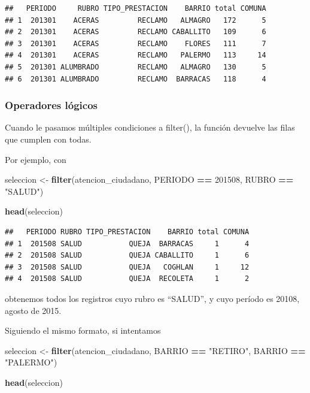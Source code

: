 \documentclass[spanish,]{book}
\newenvironment{Shaded}{\begin{snugshade}}{\end{snugshade}}
\newcommand{\DecValTok}[1]{\textcolor[rgb]{0.00,0.00,0.81}{#1}}
\newcommand{\KeywordTok}[1]{\textcolor[rgb]{0.13,0.29,0.53}{\textbf{#1}}}
\newcommand{\NormalTok}[1]{#1}
\newcommand{\OperatorTok}[1]{\textcolor[rgb]{0.81,0.36,0.00}{\textbf{#1}}}
\newcommand{\StringTok}[1]{\textcolor[rgb]{0.31,0.60,0.02}{#1}}
\begin{document}
\begin{verbatim}
##   PERIODO     RUBRO TIPO_PRESTACION    BARRIO total COMUNA
## 1  201301    ACERAS         RECLAMO   ALMAGRO   172      5
## 2  201301    ACERAS         RECLAMO CABALLITO   109      6
## 3  201301    ACERAS         RECLAMO    FLORES   111      7
## 4  201301    ACERAS         RECLAMO   PALERMO   113     14
## 5  201301 ALUMBRADO         RECLAMO   ALMAGRO   130      5
## 6  201301 ALUMBRADO         RECLAMO  BARRACAS   118      4
\end{verbatim}

\hypertarget{operadores-logicos}{%
\subsubsection{Operadores lógicos}\label{operadores-logicos}}

Cuando le pasamos múltiples condiciones a filter(), la función devuelve las filas que cumplen con todas.

Por ejemplo, con

\begin{Shaded}
\begin{Highlighting}[]
\NormalTok{seleccion <-}\StringTok{ }\KeywordTok{filter}\NormalTok{(atencion_ciudadano, PERIODO }\OperatorTok{==}\StringTok{ }\DecValTok{201508}\NormalTok{,  RUBRO }\OperatorTok{==}\StringTok{ "SALUD"}\NormalTok{)}

\KeywordTok{head}\NormalTok{(seleccion)}
\end{Highlighting}
\end{Shaded}

\begin{verbatim}
##   PERIODO RUBRO TIPO_PRESTACION    BARRIO total COMUNA
## 1  201508 SALUD           QUEJA  BARRACAS     1      4
## 2  201508 SALUD           QUEJA CABALLITO     1      6
## 3  201508 SALUD           QUEJA   COGHLAN     1     12
## 4  201508 SALUD           QUEJA  RECOLETA     1      2
\end{verbatim}

obtenemos todos los registros cuyo rubro es ``SALUD'', y cuyo período es 20108, agosto de 2015.

Siguiendo el mismo formato, si intentamos

\begin{Shaded}
\begin{Highlighting}[]
\NormalTok{seleccion <-}\StringTok{ }\KeywordTok{filter}\NormalTok{(atencion_ciudadano, BARRIO }\OperatorTok{==}\StringTok{ "RETIRO"}\NormalTok{, BARRIO }\OperatorTok{==}\StringTok{ "PALERMO"}\NormalTok{)}

\KeywordTok{head}\NormalTok{(seleccion)}
\end{Highlighting}
\end{Shaded}
\end{document}
